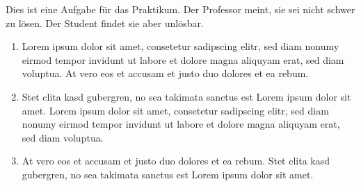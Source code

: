 Dies ist eine Aufgabe für das Praktikum.
Der Professor meint, sie sei nicht schwer zu lösen.
Der Student findet sie aber unlösbar.
\begin{enumerate}
\item Lorem ipsum dolor sit amet, consetetur sadipscing elitr, sed diam nonumy eirmod tempor invidunt ut labore et dolore magna aliquyam erat, sed diam voluptua. At vero eos et accusam et justo duo dolores et ea rebum.
\item Stet clita kasd gubergren, no sea takimata sanctus est Lorem ipsum dolor sit amet. Lorem ipsum dolor sit amet, consetetur sadipscing elitr, sed diam nonumy eirmod tempor invidunt ut labore et dolore magna aliquyam erat, sed diam voluptua.
\item At vero eos et accusam et justo duo dolores et ea rebum. Stet clita kasd gubergren, no sea takimata sanctus est Lorem ipsum dolor sit amet. 
\end{enumerate}
